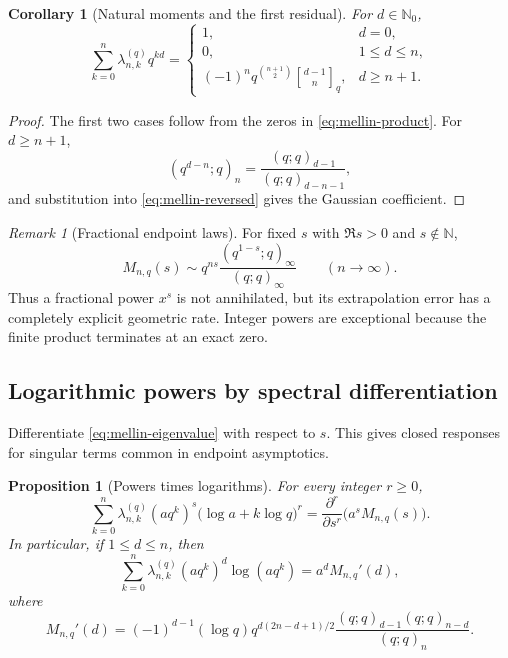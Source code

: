 \documentclass[11pt,a4paper,oneside]{article}
\newtheorem{proposition}[proposition]{Proposition}
\newtheorem{corollary}[corollary]{Corollary}
\theoremstyle{definition}
\theoremstyle{remark}
\newtheorem{remark}[remark]{Remark}
\newcommand{\N}{\mathbb N}
\newcommand{\qbinom}[3]{\genfrac{[}{]}{0pt}{}{#1}{#2}_{#3}}
\begin{document}
\begin{corollary}[Natural moments and the first residual]
\label{cor:integer-moments}
For $d\in\N_0$,
\begin{equation}
 \sum_{k=0}^n\lambda_{n,k}^{(q)}q^{kd}
 =\begin{cases}
 1,&d=0,\\
 0,&1\le d\le n,\\
 (-1)^nq^{\binom{n+1}{2}}\qbinom{d-1}{n}q,&d\ge n+1.
 \end{cases}
 \label{eq:integer-moment-law}
\end{equation}
\end{corollary}

\begin{proof}
The first two cases follow from the zeros in
\eqref{eq:mellin-product}.  For $d\ge n+1$,
\[
 (q^{d-n};q)_n=\frac{(q;q)_{d-1}}{(q;q)_{d-n-1}},
\]
and substitution into \eqref{eq:mellin-reversed} gives the Gaussian
coefficient.
\end{proof}

\begin{remark}[Fractional endpoint laws]
For fixed $s$ with $\Re s>0$ and $s\notin\N$,
\begin{equation}
 M_{n,q}(s)
 \sim q^{ns}\frac{(q^{1-s};q)_\infty}{(q;q)_\infty}
 \qquad(n\to\infty).
 \label{eq:fractional-asymptotic}
\end{equation}
Thus a fractional power $x^s$ is not annihilated, but its extrapolation error
has a completely explicit geometric rate.  Integer powers are exceptional
because the finite product terminates at an exact zero.
\end{remark}

\subsection{Logarithmic powers by spectral differentiation}

Differentiate \eqref{eq:mellin-eigenvalue} with respect to $s$.  This gives
closed responses for singular terms common in endpoint asymptotics.

\begin{proposition}[Powers times logarithms]
\label{prop:log-powers}
For every integer $r\ge0$,
\begin{equation}
 \sum_{k=0}^n\lambda_{n,k}^{(q)}(aq^k)^s
 \bigl(\log a+k\log q\bigr)^r
 =\frac{\partial^r}{\partial s^r}\bigl(a^sM_{n,q}(s)\bigr).
 \label{eq:log-power-response}
\end{equation}
In particular, if $1\le d\le n$, then
\begin{equation}
 \sum_{k=0}^n\lambda_{n,k}^{(q)}(aq^k)^d\log(aq^k)
 =a^dM_{n,q}'(d),
 \label{eq:first-log-response}
\end{equation}
where
\begin{equation}
 M_{n,q}'(d)
 =(-1)^{d-1}(\log q)
 q^{d(2n-d+1)/2}
 \frac{(q;q)_{d-1}(q;q)_{n-d}}{(q;q)_n}.
 \label{eq:mellin-derivative-integer}
\end{equation}
\end{proposition}
\end{document}
